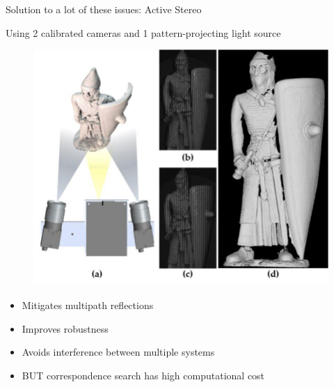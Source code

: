 
\begin{frame}{Solution to a lot of these issues: Active Stereo}

Using 2 calibrated cameras and 1 pattern-projecting light source
\begin{figure}
\includegraphics[scale=0.1]{pictures/polop5}
\end{figure}
\begin{itemize}
\item Mitigates multipath reflections
\item Improves robustness
\item Avoids interference between multiple systems\\
\item BUT correspondence search has high computational cost
\end{itemize}

\end{frame}

